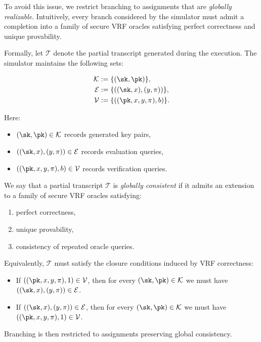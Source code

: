 \documentclass[11pt]{article}
\begin{document}
To avoid this issue, we restrict branching to assignments that are
\emph{globally realizable}. Intuitively, every branch considered by
the simulator must admit a completion into a family of secure VRF
oracles satisfying perfect correctness and unique provability.

Formally, let $\mathcal T$ denote the partial transcript generated
during the execution. The simulator maintains the following sets:

\begin{align*}
    \mathcal K &:= \{ (\sk,\pk) \}, \\
    \mathcal E &:= \{ ((\sk,x),(y,\pi)) \}, \\
    \mathcal V &:= \{ ((\pk,x,y,\pi),b) \}.
\end{align*}

Here:
\begin{itemize}
    \item $(\sk,\pk) \in \mathcal K$ records generated key pairs,
    \item $((\sk,x),(y,\pi)) \in \mathcal E$ records evaluation
    queries,
    \item $((\pk,x,y,\pi),b) \in \mathcal V$ records verification
    queries.
\end{itemize}

We say that a partial transcript $\mathcal T$ is
\emph{globally consistent} if it admits an extension to a family of
secure VRF oracles satisfying:
\begin{enumerate}
    \item perfect correctness,
    \item unique provability,
    \item consistency of repeated oracle queries.
\end{enumerate}

Equivalently, $\mathcal T$ must satisfy the closure conditions
induced by VRF correctness:

\begin{itemize}
    \item If $((\pk,x,y,\pi),1) \in \mathcal V$, then for every
    $(\sk,\pk) \in \mathcal K$ we must have
    $((\sk,x),(y,\pi)) \in \mathcal E$.

    \item If $((\sk,x),(y,\pi)) \in \mathcal E$, then for every
    $(\sk,\pk) \in \mathcal K$ we must have
    $((\pk,x,y,\pi),1) \in \mathcal V$.
\end{itemize}

Branching is then restricted to assignments preserving global
consistency.
\end{document}
